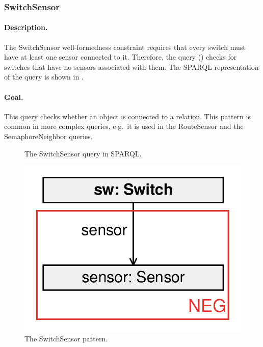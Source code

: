 \subsubsection{SwitchSensor}

\paragraph{Description.} The \textsf{SwitchSensor} well-formedness constraint requires that every switch must have at least one sensor connected to it. Therefore, the query () checks for switches that have no sensors associated with them. The SPARQL representation of the query is shown in .

\paragraph{Goal.} This query checks whether an object is connected to a relation. This pattern is common in more complex queries, e.g.\ it is used in the \textsf{RouteSensor} and the \textsf{SemaphoreNeighbor} queries.

\begin{figure}[htb]
\centering
\begin{minipage}{0.6\textwidth}
  { \alignListing
    }
  \caption{The \textsf{SwitchSensor} query in SPARQL.}
  \label{lst:switchsensor-sparql}
\end{minipage}
\end{figure}


\begin{figure}[htb]
	\centering
	\includegraphics[scale=0.4]{figures/pattern-switchsensor}
	\caption{The \textsf{SwitchSensor} pattern.}
	\label{fig:pattern-switchsensor}
\end{figure}

